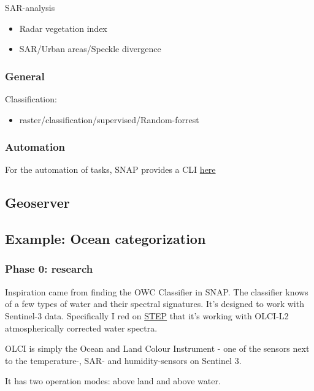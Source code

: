 SAR-analysis
\begin{itemize}
    \item Radar vegetation index
    \item SAR/Urban areas/Speckle divergence
\end{itemize}

\subsubsection{General}

Classification:
\begin{itemize}
    \item raster/classification/supervised/Random-forrest
\end{itemize}

\subsubsection{Automation}
For the automation of tasks, SNAP provides a CLI \href{http://step.esa.int/docs/tutorials/SNAP_CommandLine_Tutorial.pdf}{here}




\subsection{Geoserver}





\subsection{Example: Ocean categorization}

\subsubsection{Phase 0: research}
Inspiration came from finding the OWC Classifier in SNAP. The classifier knows of a few types of water and their spectral signatures.
It's designed to work with Sentinel-3 data.
Specifically I red on \href{https://forum.step.esa.int/t/owt-classification/11360}{STEP} that it's working with OLCI-L2 atmospherically corrected water spectra.

OLCI is simply the Ocean and Land Colour Instrument - one of the sensors next to the temperature-, SAR- and humidity-sensors on Sentinel 3.

It has two operation modes: above land and above water.

